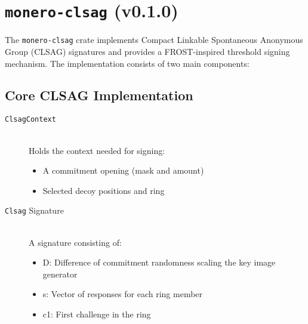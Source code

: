 \documentclass[12pt,a4paper]{article}
\begin{document}
\section{\texttt{monero-clsag} (v0.1.0)}
The \texttt{monero-clsag} crate implements Compact Linkable Spontaneous Anonymous Group (CLSAG) signatures and provides a FROST-inspired threshold signing mechanism.
The implementation consists of two main components:

\subsection{Core CLSAG Implementation}
\begin{description}
\item[\texttt{ClsagContext}] \hfill \\ %
Holds the context needed for signing:
\begin{itemize}
\item A commitment opening (mask and amount)
\item Selected decoy positions and ring
\end{itemize}

\item[\texttt{Clsag} Signature] \hfill \\ %
A signature consisting of:
\begin{itemize}
\item D: Difference of commitment randomness scaling the key image generator
\item s: Vector of responses for each ring member
\item c1: First challenge in the ring
\end{itemize}


\end{description}
\end{document}
